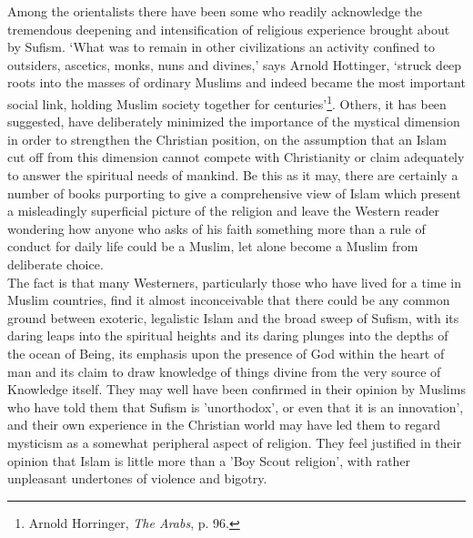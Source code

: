 \documentclass[10pt, twoside]{book}
\begin{document}
Among the orientalists there have been some who readily acknowledge the tremendous deepening and 
intensification of religious experience brought about by Sufism. `What was to remain in other 
civilizations an activity confined to outsiders, ascetics, monks, nuns and divines,' says Arnold 
Hottinger, `struck deep roots into the masses of ordinary Muslims and indeed became the most 
important social link, holding Muslim society together for centuries'\footnote{Arnold Horringer, \emph{The Arabs}, p. 96.}. Others, it has been 
suggested, have deliberately minimized the importance of the mystical dimension in order to 
strengthen the Christian position, on the assumption that an Islam cut off from this dimension cannot 
compete with Christianity or claim adequately to answer the spiritual needs of mankind. Be this as it 
may, there are certainly a number of books purporting to give a comprehensive view of Islam which 
present a misleadingly superficial picture of the religion and leave the Western reader wondering how 
anyone who asks of his faith something more than a rule of conduct for daily life could be a Muslim, 
let alone become a Muslim from deliberate choice. \\

The fact is that many Westerners, particularly those who have lived for a time in Muslim countries, 
find it almost inconceivable that there could be any common ground between exoteric, legalistic Islam 
and the broad sweep of Sufism, with its daring leaps into the spiritual heights and its daring 
plunges into the depths of the ocean of Being, its emphasis upon the presence of God within the heart 
of man and its claim to draw knowledge of things divine from the very source of Knowledge itself. 
They may well have been confirmed in their opinion by Muslims who have told them that Sufism is 
'unorthodox', or even that it is an innovation', and their own experience in the Christian world may 
have led them to regard mysticism as a somewhat peripheral aspect of religion. They feel justified in 
their opinion that Islam is little more than a 'Boy Scout religion', with rather unpleasant 
undertones of violence and bigotry. \\
\end{document}
